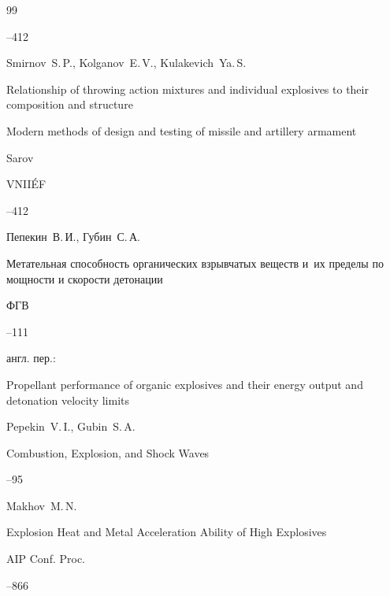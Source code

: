 \begin{thebibliography}{99}

--412

\misctransl

\by Smirnov~S.\,P., Kolganov~E.\,V., Kulakevich~Ya.\,S.

\paper Relationship of throwing action mixtures and individual explosives to their composition and structure

\inbook Modern methods of design and testing of missile and artillery armament

\publaddr Sarov

\publ VNII\'EF


--412




\by Пепекин~В.\,И., Губин~С.\,А.

\paper Метательная способность органических взрывчатых веществ и~их пределы по мощности и скорости детонации

\jour ФГВ




--111

\transl англ. пер.:~

\paper Propellant performance of organic explosives and their energy output and detonation velocity limits

\by Pepekin~V.\,I., Gubin~S.\,A.

\jour Combustion, Explosion, and Shock Waves




--95




\by Makhov~M.\,N.

\paper Explosion Heat and Metal Acceleration Ability of High Explosives

\jour AIP Conf. Proc.



--866








\end{thebibliography}
